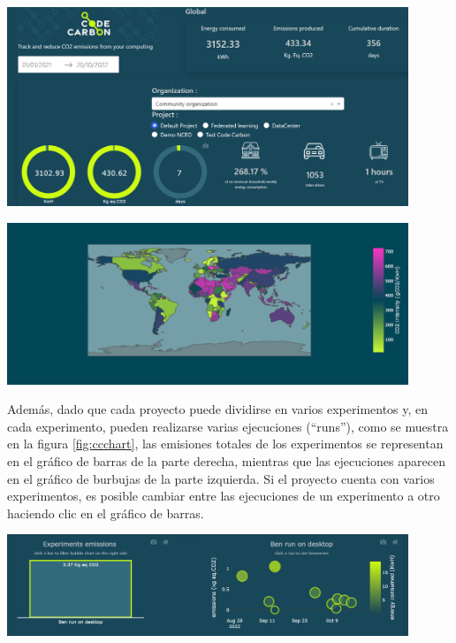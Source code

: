 \documentclass[12pt,a4paper]{report}
\begin{document}
\begin{center}
  \includegraphics[width=0.9\textwidth]{imagenes/CC_3.png}
  \label{fig:cconline}
\end{center}

\begin{center}
  \includegraphics[width=0.9\textwidth]{imagenes/CC_5.png}
  \label{fig:ccmapweb}
\end{center}

Además, dado que cada proyecto puede dividirse en varios experimentos y, en cada experimento, pueden 
realizarse varias ejecuciones (“runs”), como se muestra en la figura \ref{fig:ccchart}, las emisiones 
totales de los experimentos se representan en el gráfico de barras de la parte derecha, mientras que las 
ejecuciones aparecen en el gráfico de burbujas de la parte izquierda. Si el proyecto cuenta con varios 
experimentos, es posible cambiar entre las ejecuciones de un experimento a otro haciendo clic en el 
gráfico de barras.

\begin{center}
  \includegraphics[width=0.9\textwidth]{imagenes/CC_4.png}
  \label{fig:ccchart}
\end{center}
\end{document}
